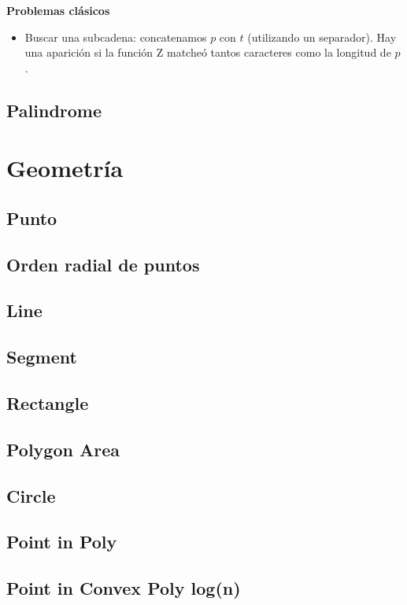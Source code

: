 \textbf{Problemas clásicos}
\begin{itemize}
    \item Buscar una subcadena: concatenamos $p$ con $t$ (utilizando un separador).
    Hay una aparición si la función Z matcheó tantos caracteres como la longitud
    de $p$.
\end{itemize}
\subsection{Palindrome}

\section{Geometría}%
\subsection{Punto}
\subsection{Orden radial de puntos}
\subsection{Line}
\subsection{Segment}
\subsection{Rectangle}
\subsection{Polygon Area}
\subsection{Circle}
\subsection{Point in Poly}
\subsection{Point in Convex Poly log(n)}
